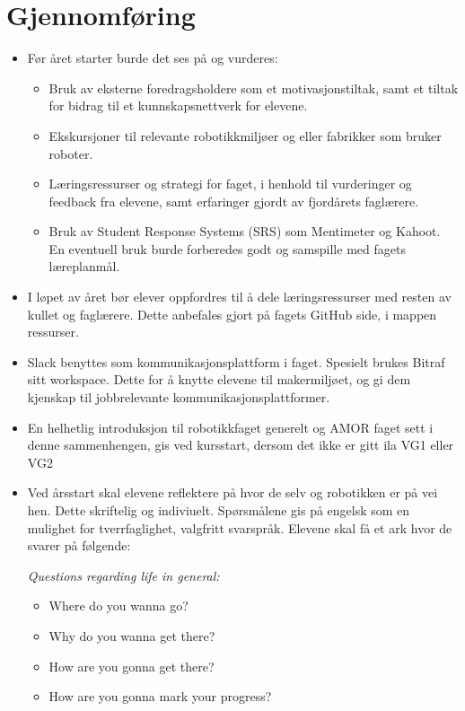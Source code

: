 \section*{Gjennomføring} \label{Sec: Gjennom}

    \begin{itemize}

        \item Før året starter burde det ses på og vurderes:

            \begin{itemize}
                \item Bruk av eksterne foredragsholdere som et motivasjonstiltak, samt et tiltak for bidrag til et kunnskapsnettverk for elevene.
                \item Ekskursjoner til relevante robotikkmiljøer og eller fabrikker som bruker roboter.
                \item Læringsressurser og strategi for faget, i henhold til vurderinger og feedback fra elevene, samt erfaringer gjordt av fjordårets faglærere.
                \item Bruk av Student Response Systems (SRS) som Mentimeter og Kahoot. En eventuell bruk burde forberedes godt og samspille med fagets læreplanmål.
            \end{itemize}

        \item I løpet av året bør elever oppfordres til å dele læringsressurser med resten av kullet og faglærere. Dette anbefales gjort på fagets GitHub side, i mappen ressurser.
        \item Slack benyttes som kommunikasjonsplattform i faget. Spesielt brukes Bitraf sitt workspace. Dette for å knytte elevene til makermiljøet, og gi dem kjenskap til jobbrelevante kommunikasjonsplattformer.
        \item En helhetlig introduksjon til robotikkfaget generelt og AMOR faget sett i denne sammenhengen, gis ved kursstart, dersom det ikke er gitt ila VG1 eller VG2
        \item Ved årsstart skal elevene reflektere på hvor de selv og robotikken er på vei hen. Dette skriftelig og indiviuelt. Spørsmålene gis på engelsk som en mulighet for tverrfaglighet, valgfritt svarspråk. Elevene skal få et ark hvor de svarer på følgende:

            \emph{Questions regarding life in general:}
            \begin{itemize}


                \item Where do you wanna go?
                \item Why do you wanna get there?
                \item How are you gonna get there?
                \item How are you gonna mark your progress?


\end{itemize}
\end{itemize}
